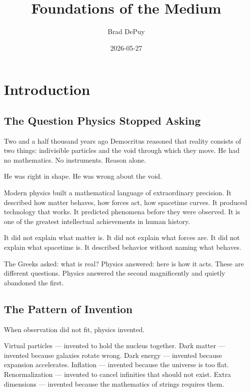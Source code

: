 \documentclass[11pt]{article}
\author{Brad DePuy}
\date{2026-05-27}
\title{Foundations of the Medium}
\begin{document}
\maketitle
\tableofcontents


\section{Introduction}
\label{sec:orgf0a43a9}

\subsection{The Question Physics Stopped Asking}
\label{sec:orgc425a5b}

Two and a half thousand years ago Democritus reasoned that reality consists of
two things: indivisible particles and the void through which they move. He had no
mathematics. No instruments. Reason alone.

He was right in shape. He was wrong about the void.

Modern physics built a mathematical language of extraordinary precision. It
described how matter behaves, how forces act, how spacetime curves. It produced
technology that works. It predicted phenomena before they were observed. It is
one of the greatest intellectual achievements in human history.

It did not explain what matter is. It did not explain what forces are. It did not
explain what spacetime is. It described behavior without naming what behaves.

The Greeks asked: what is real? Physics answered: here is how it acts. These are
different questions. Physics answered the second magnificently and quietly
abandoned the first.

\subsection{The Pattern of Invention}
\label{sec:org6d09d62}

When observation did not fit, physics invented.

Virtual particles — invented to hold the nucleus together. Dark matter — invented
because galaxies rotate wrong. Dark energy — invented because expansion
accelerates. Inflation — invented because the universe is too flat.
Renormalization — invented to cancel infinities that should not exist. Extra
dimensions — invented because the mathematics of strings requires them.
\end{document}
